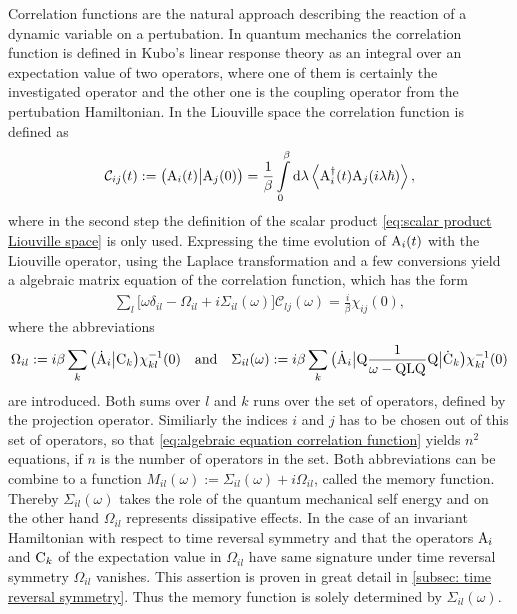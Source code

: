 Correlation functions are the natural approach describing the reaction of a dynamic variable on a pertubation.
In quantum mechanics the correlation function is defined in Kubo's linear response theory as an integral over an expectation value of two operators, where one of them is certainly the investigated operator and the other one is the coupling operator from the pertubation Hamiltonian.
In the Liouville space the correlation function is defined as
%
\begin{align}
	\mathcal{C}_{ij}(t) := \big({\mathrm{A}_{i}(t)}\big|{\mathrm{A}_{j}(0)}\big) = \frac{1}{\beta} \int\limits_{0}^{\beta} \dd{\lambda} \expval{\mathrm{A}_{i}^{\dag}(t) \mathrm{A}_{j}(i\lambda\hbar)},
	\label{eq:correlation function in LS}
\end{align}
%
where in the second step the definition of the scalar product \eqref{eq:scalar product Liouville space} is only used.
Expressing the time evolution of $\mathrm{A}_{i}(t)$ with the Liouville operator, using the Laplace transformation and a few conversions yield a algebraic matrix equation of the correlation function, which has the form
%
\begin{align}
	\sum\limits_{l} \Big[\omega \delta_{il} - \Omega_{il} + i \Sigma_{il}(\omega)\Big] \mathcal{C}_{lj}(\omega) = \frac{i}{\beta} \chi_{ij}(0),
	\label{eq:algebraic equation correlation function}
\end{align}
%
where the abbreviations 
%
\begin{align}
	\Omega_{il} := i \beta \sum\limits_{k} \obraket{\dot{\mt{A}}_{i}}{\mt{C}_{k}} \chi_{kl}^{-1}(0)
	\qq{and}
	\Sigma_{il}(\omega) := i \beta \sum\limits_{k} \obra{\dot{\mt{A}}_{i}} \mt{Q} \frac{1}{\omega - \mt{QLQ}} \mt{Q} \oket{\dot{\mt{C}}_{k}} \chi_{kl}^{-1}(0)
	\label{eq:Omega&Sigma}
\end{align}
%
are introduced.
Both sums over $l$ and $k$ runs over the set of operators, defined by the projection operator.
Similiarly the indices $i$ and $j$ has to be chosen out of this set of operators, so that \eqref{eq:algebraic equation correlation function} yields $n^{2}$ equations, if $n$ is the number of operators in the set.
Both abbreviations can be combine to a function $M_{il}(\omega) := \Sigma_{il}(\omega) +i \Omega_{il}$, called the memory function.
Thereby $\Sigma_{il}(\omega)$ takes the role of the quantum mechanical self energy and on the other hand $\Omega_{il}$ represents dissipative effects.
In the case of an invariant Hamiltonian with respect to time reversal symmetry and that the operators $\mathrm{A}_{i}$ and $\mathrm{C}_{k}$ of the expectation value in $\Omega_{il}$ have same signature under time reversal symmetry $\Omega_{il}$ vanishes.
This assertion is proven in great detail in \ref{subsec: time reversal symmetry}.
Thus the memory function is solely determined by $\Sigma_{il}(\omega)$.

